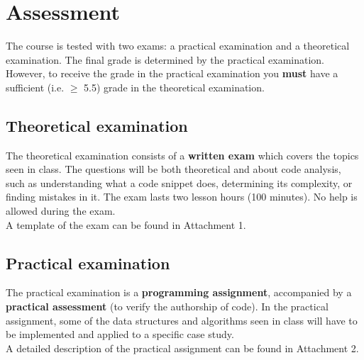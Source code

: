 \section{Assessment}
	The course is tested with two exams: a practical examination and a theoretical examination. The final grade is determined by the practical examination. However, to receive the grade in the practical examination you \textbf{must} have a sufficient (i.e. $\geq$ 5.5) grade in the theoretical examination.

	\subsection{Theoretical examination}
		The theoretical examination consists of a \textbf{written exam} which covers the topics seen in class. The questions will be both theoretical and about code analysis, such as understanding what a code snippet does, determining its complexity, or finding mistakes in it.
		The exam lasts two lesson hours (100 minutes). No help is allowed during the exam.\\
		A template of the exam can be found in Attachment 1.

	\subsection{Practical examination}
	The practical examination is a \textbf{programming assignment}, accompanied by a \textbf{practical assessment} (to verify the authorship of code). In the practical assignment, some of the data structures and algorithms seen in class will have to be implemented and applied to a specific case study.\\ 
	A detailed description of the practical assignment can be found in Attachment 2.
	
